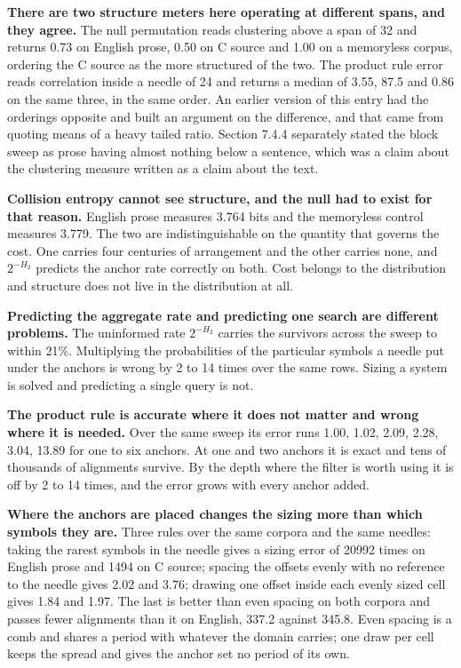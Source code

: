 \textbf{There are two structure meters here operating at different spans, and they agree.} The null permutation reads clustering above a span of 32 and returns 0.73 on English prose, 0.50 on C source and 1.00 on a memoryless corpus, ordering the C source as the more structured of the two. The product rule error reads correlation inside a needle of 24 and returns a median of 3.55, 87.5 and 0.86 on the same three, in the same order. An earlier version of this entry had the orderings opposite and built an argument on the difference, and that came from quoting means of a heavy tailed ratio. Section 7.4.4 separately stated the block sweep as prose having almost nothing below a sentence, which was a claim about the clustering measure written as a claim about the text.

\textbf{Collision entropy cannot see structure, and the null had to exist for that reason.} English prose measures 3.764 bits and the memoryless control measures 3.779. The two are indistinguishable on the quantity that governs the cost. One carries four centuries of arrangement and the other carries none, and \(2^{-H_2}\) predicts the anchor rate correctly on both. Cost belongs to the distribution and structure does not live in the distribution at all.

\textbf{Predicting the aggregate rate and predicting one search are different problems.} The uninformed rate \(2^{-H_2}\) carries the survivors across the sweep to within 21\%. Multiplying the probabilities of the particular symbols a needle put under the anchors is wrong by 2 to 14 times over the same rows. Sizing a system is solved and predicting a single query is not.

\textbf{The product rule is accurate where it does not matter and wrong where it is needed.} Over the same sweep its error runs 1.00, 1.02, 2.09, 2.28, 3.04, 13.89 for one to six anchors. At one and two anchors it is exact and tens of thousands of alignments survive. By the depth where the filter is worth using it is off by 2 to 14 times, and the error grows with every anchor added.

\textbf{Where the anchors are placed changes the sizing more than which symbols they are.} Three rules over the same corpora and the same needles: taking the rarest symbols in the needle gives a sizing error of 20992 times on English prose and 1494 on C source; spacing the offsets evenly with no reference to the needle gives 2.02 and 3.76; drawing one offset inside each evenly sized cell gives 1.84 and 1.97. The last is better than even spacing on both corpora and passes fewer alignments than it on English, 337.2 against 345.8. Even spacing is a comb and shares a period with whatever the domain carries; one draw per cell keeps the spread and gives the anchor set no period of its own.

